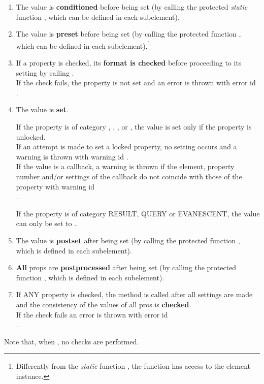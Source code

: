 \documentclass{tufte-handout}
\begin{document}
\begin{enumerate}
	\item The value is {\bf conditioned} before being set (by calling the protected \emph{static} function , which can be defined in each subelement).
	
	\item The value is {\bf preset} before being set (by calling the protected function , which can be defined in each subelement).\footnote{Differently from the \emph{static} function , the function  has access to the element instance.}
	
	\item If a property is checked, its {\bf format is checked} before proceeding to its setting by calling .\\
	If the check fails, the property is not set and an error is thrown with error id\\
	.

	\item The value is {\bf set}.

		If the property is of category , , , or , the value is set only if the property is unlocked.\\
		If an attempt is made to set a locked property, no setting occurs and a warning is thrown with warning id .\\
		If the value is a callback, a warning is thrown if the element, property number and/or settings of the callback do not coincide with those of the property with warning id\\
		.
 
		If the property is of category RESULT, QUERY or EVANESCENT, the value can only be set to .

	\item The value is {\bf postset} after being set (by calling the protected function , which is defined in each subelement).

	\item {\bf All} props are {\bf postprocessed} after being set (by calling the protected function , which is defined in each subelement).

	\item If ANY property is checked, the method  is called after all settings are made and the consistency of the values of all pros is {\bf checked}.\\
	If the check fails an error is thrown with error id\\
	.
\end{enumerate} 
Note that, when , no checks are performed.
 
\end{document}
